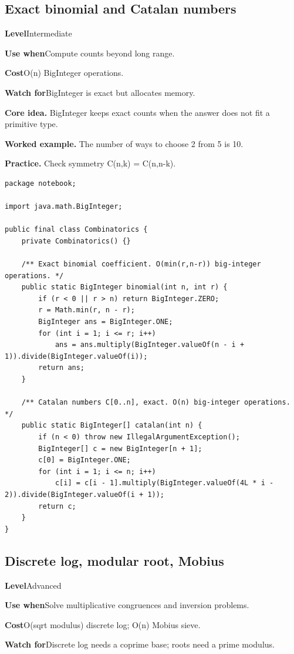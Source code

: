 \documentclass[10pt,letterpaper]{article}
\newcommand{\entrylabel}[1]{\textcolor{accent}{\bfseries #1}}
\begin{document}
\subsection{Exact binomial and Catalan numbers}
\begin{guidebox}\small
\entrylabel{Level}\quad Intermediate\par
\entrylabel{Use when}\quad Compute counts beyond long range.\par
\entrylabel{Cost}\quad O(n) BigInteger operations.\par
\entrylabel{Watch for}\quad BigInteger is exact but allocates memory.\par
\end{guidebox}
\noindent\textbf{Core idea.} BigInteger keeps exact counts when the answer does not fit a primitive type.\par
\noindent\textbf{Worked example.} The number of ways to choose 2 from 5 is 10.\par
\noindent\textbf{Practice.} Check symmetry C(n,k) = C(n,n-k).\par
\begin{lstlisting}
package notebook;

import java.math.BigInteger;

public final class Combinatorics {
    private Combinatorics() {}

    /** Exact binomial coefficient. O(min(r,n-r)) big-integer operations. */
    public static BigInteger binomial(int n, int r) {
        if (r < 0 || r > n) return BigInteger.ZERO;
        r = Math.min(r, n - r);
        BigInteger ans = BigInteger.ONE;
        for (int i = 1; i <= r; i++)
            ans = ans.multiply(BigInteger.valueOf(n - i + 1)).divide(BigInteger.valueOf(i));
        return ans;
    }

    /** Catalan numbers C[0..n], exact. O(n) big-integer operations. */
    public static BigInteger[] catalan(int n) {
        if (n < 0) throw new IllegalArgumentException();
        BigInteger[] c = new BigInteger[n + 1];
        c[0] = BigInteger.ONE;
        for (int i = 1; i <= n; i++)
            c[i] = c[i - 1].multiply(BigInteger.valueOf(4L * i - 2)).divide(BigInteger.valueOf(i + 1));
        return c;
    }
}
\end{lstlisting}
\subsection{Discrete log, modular root, Mobius}
\begin{guidebox}\small
\entrylabel{Level}\quad Advanced\par
\entrylabel{Use when}\quad Solve multiplicative congruences and inversion problems.\par
\entrylabel{Cost}\quad O(sqrt modulus) discrete log; O(n) Mobius sieve.\par
\entrylabel{Watch for}\quad Discrete log needs a coprime base; roots need a prime modulus.\par
\end{guidebox}
\end{document}
